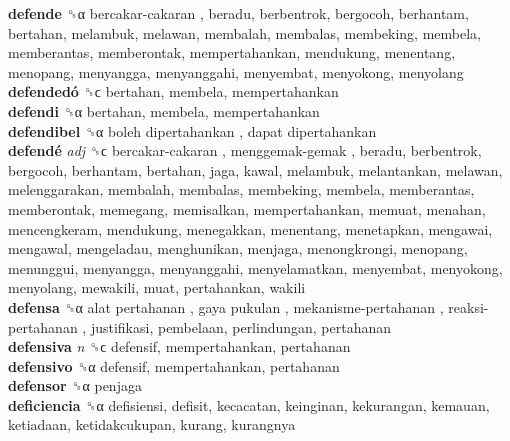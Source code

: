 \textbf{defende} ␝α   bercakar-cakaran , beradu, berbentrok, bergocoh, berhantam, bertahan, melambuk, melawan, membalah, membalas, membeking, membela, memberantas, memberontak, mempertahankan, mendukung, menentang, menopang, menyangga, menyanggahi, menyembat, menyokong, menyolang  \\
\textbf{defendedó} ␝ϲ  bertahan, membela, mempertahankan  \\
\textbf{defendi} ␝α  bertahan, membela, mempertahankan  \\
\textbf{defendibel} ␝α   boleh dipertahankan ,  dapat dipertahankan   \\
\textbf{defendé} \emph{adj}  ␝ϲ   bercakar-cakaran ,  menggemak-gemak , beradu, berbentrok, bergocoh, berhantam, bertahan, jaga, kawal, melambuk, melantankan, melawan, melenggarakan, membalah, membalas, membeking, membela, memberantas, memberontak, memegang, memisalkan, mempertahankan, memuat, menahan, mencengkeram, mendukung, menegakkan, menentang, menetapkan, mengawai, mengawal, mengeladau, menghunikan, menjaga, menongkrongi, menopang, menunggui, menyangga, menyanggahi, menyelamatkan, menyembat, menyokong, menyolang, mewakili, muat, pertahankan, wakili  \\
\textbf{defensa} ␝α   alat pertahanan ,  gaya pukulan ,  mekanisme-pertahanan ,  reaksi-pertahanan , justifikasi, pembelaan, perlindungan, pertahanan  \\
\textbf{defensiva} \emph{n}  ␝ϲ  defensif, mempertahankan, pertahanan  \\
\textbf{defensivo} ␝α  defensif, mempertahankan, pertahanan  \\
\textbf{defensor} ␝α  penjaga  \\
\textbf{deficiencia} ␝α  defisiensi, defisit, kecacatan, keinginan, kekurangan, kemauan, ketiadaan, ketidakcukupan, kurang, kurangnya  \\

